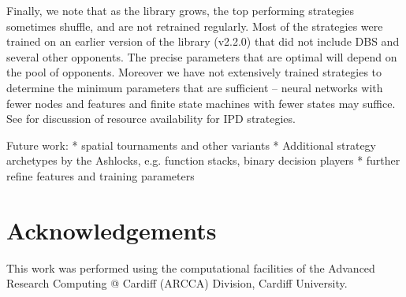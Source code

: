 \documentclass{article}
\begin{document}
Finally, we note that as the library grows, the top performing strategies
sometimes shuffle, and are not retrained regularly. Most of the strategies were
trained on an earlier version of the library (v2.2.0) that did not include DBS
and several other opponents. The precise parameters that are optimal will depend
on the pool of opponents. Moreover we have not extensively trained strategies to
determine the minimum parameters that are sufficient -- neural networks with
fewer nodes and features and finite state machines with fewer states may suffice.
See \cite{ashlock2013impact} for discussion of resource availability for IPD strategies.


Future work:
* spatial tournaments and other variants
* Additional strategy archetypes by the Ashlocks, e.g. function stacks, binary
decision players
* further refine features and training parameters



\section*{Acknowledgements}

This work was performed using the computational facilities of the Advanced
Research Computing @ Cardiff (ARCCA) Division, Cardiff University.

\printbibliography
\end{document}

